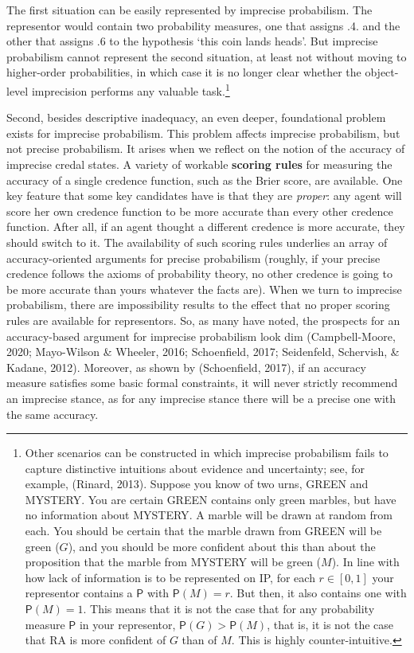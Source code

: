 \documentclass[
  10pt,
  dvipsnames,enabledeprecatedfontcommands]{scrartcl}
\newcommand{\pr}[1]{\mathsf{P}(#1)}
\begin{document}
\noindent The first situation can be easily represented by imprecise
probabilism. The representor would contain two probability measures, one
that assigns .4. and the other that assigns .6 to the hypothesis `this
coin lands heads'. But imprecise probabilism cannot represent the second
situation, at least not without moving to higher-order probabilities, in
which case it is no longer clear whether the object-level imprecision
performs any valuable task.\footnote{Other scenarios can be constructed
  in which imprecise probabilism fails to capture distinctive intuitions
  about evidence and uncertainty; see, for example, (Rinard, 2013).
  Suppose you know of two urns, \textsf{GREEN} and \textsf{MYSTERY}. You
  are certain \textsf{GREEN} contains only green marbles, but have no
  information about \textsf{MYSTERY}. A marble will be drawn at random
  from each. You should be certain that the marble drawn from
  \textsf{GREEN} will be green (\(G\)), and you should be more confident
  about this than about the proposition that the marble from
  \textsf{MYSTERY} will be green (\(M\)). In line with how lack of
  information is to be represented on \textsf{IP}, for each
  \(r\in [0,1]\) your representor contains a \(\mathsf{P}\) with
  \(\pr{M}=r\). But then, it also contains one with \(\pr{M}=1\). This
  means that it is not the case that for any probability measure
  \(\mathsf{P}\) in your representor, \(\mathsf{P}(G) > \mathsf{P}(M)\),
  that is, it is not the case that RA is more confident of \(G\) than of
  \(M\). This is highly counter-intuitive.}

Second, besides descriptive inadequacy, an even deeper, foundational
problem exists for imprecise probabilism. This problem affects imprecise
probabilism, but not precise probabilism. It arises when we reflect on
the notion of the accuracy of imprecise credal states. A variety of
workable \textbf{scoring rules} for measuring the accuracy of a single
credence function, such as the Brier score, are available. One key
feature that some key candidates have is that they are \emph{proper}:
any agent will score her own credence function to be more accurate than
every other credence function. After all, if an agent thought a
different credence is more accurate, they should switch to it. The
availability of such scoring rules underlies an array of
accuracy-oriented arguments for precise probabilism (roughly, if your
precise credence follows the axioms of probability theory, no other
credence is going to be more accurate than yours whatever the facts
are). When we turn to imprecise probabilism, there are impossibility
results to the effect that no proper scoring rules are available for
representors. So, as many have noted, the prospects for an
accuracy-based argument for imprecise probabilism look dim
(Campbell-Moore, 2020; Mayo-Wilson \& Wheeler, 2016; Schoenfield, 2017;
Seidenfeld, Schervish, \& Kadane, 2012). Moreover, as shown by
(Schoenfield, 2017), if an accuracy measure satisfies some basic formal
constraints, it will never strictly recommend an imprecise stance, as
for any imprecise stance there will be a precise one with the same
accuracy.
\end{document}
